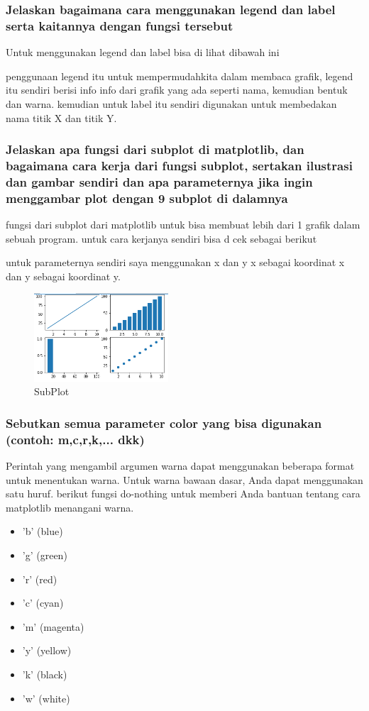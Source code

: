 \subsubsection{Jelaskan bagaimana cara menggunakan legend dan label serta kaitannya dengan fungsi tersebut}
\hfill \break
Untuk menggunakan legend dan label bisa di lihat dibawah ini

penggunaan legend itu untuk mempermudahkita dalam membaca grafik, legend itu sendiri berisi info info dari grafik yang ada seperti nama, kemudian bentuk dan warna.
kemudian untuk label itu sendiri digunakan untuk membedakan nama titik X dan titik Y.
\subsubsection{Jelaskan apa fungsi dari subplot di matplotlib, dan bagaimana cara kerja dari fungsi subplot, sertakan ilustrasi dan gambar sendiri dan apa parameternya jika ingin menggambar plot dengan 9 subplot di dalamnya}
\hfill \break
fungsi dari subplot dari matplotlib untuk bisa membuat lebih dari 1 grafik dalam sebuah program.
untuk cara kerjanya sendiri bisa d cek sebagai berikut

untuk parameternya sendiri saya menggunakan x dan y x sebagai koordinat x dan y sebagai koordinat y.
\begin{figure}[H]	
    \includegraphics[width=5cm]{figures/6/1154016/teori/chart.png}
    \centering
    \caption{SubPlot}
\end{figure}
\subsubsection{Sebutkan semua parameter color yang bisa digunakan (contoh: m,c,r,k,... dkk)}
\hfill \break
Perintah yang mengambil argumen warna dapat menggunakan beberapa format untuk menentukan warna. Untuk warna bawaan dasar, Anda dapat menggunakan satu huruf. berikut fungsi do-nothing untuk memberi Anda bantuan tentang cara matplotlib menangani warna. 
\begin{itemize}
	\item 'b' (blue)
	\item 'g' (green)
	\item 'r' (red)
	\item 'c' (cyan)
	\item 'm' (magenta)
	\item 'y' (yellow)
	\item 'k' (black)
	\item 'w' (white)
\end{itemize}

